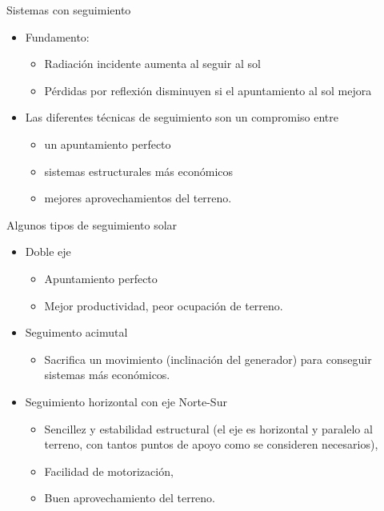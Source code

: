 \documentclass[xcolor={usenames,svgnames,dvipsnames}]{beamer}
\begin{document}
\begin{frame}[label={sec:orgd164202}]{Sistemas con seguimiento}
\begin{itemize}[<+->]
\item \alert{Fundamento:}
\begin{itemize}[<.->]
\item Radiación incidente aumenta al seguir al sol

\item Pérdidas por reflexión disminuyen si el apuntamiento al sol mejora
\end{itemize}

\item Las diferentes técnicas de seguimiento son un \alert{compromiso} entre
\begin{itemize}[<.->]
\item un \alert{apuntamiento perfecto}

\item \alert{sistemas estructurales más económicos}

\item mejores \alert{aprovechamientos del terreno}.
\end{itemize}
\end{itemize}
\end{frame}
\begin{frame}[label={sec:org0ba5e5a}]{Algunos tipos de seguimiento solar}
\begin{itemize}[<+->]
\item \alert{Doble eje}
\begin{itemize}[<.->]
\item Apuntamiento \guillemotleft{}perfecto\guillemotright{}

\item Mejor productividad, peor ocupación de terreno.
\end{itemize}

\item \alert{Seguimento acimutal}
\begin{itemize}[<.->]
\item Sacrifica un movimiento (inclinación del generador) para conseguir
sistemas más económicos.
\end{itemize}

\item \alert{Seguimiento horizontal con eje Norte-Sur}
\begin{itemize}[<.->]
\item Sencillez y estabilidad estructural (el eje es horizontal y
paralelo al terreno, con tantos puntos de apoyo como se consideren
necesarios),

\item Facilidad de motorización,

\item Buen aprovechamiento del terreno.
\end{itemize}
\end{itemize}
\end{frame}
\end{document}

